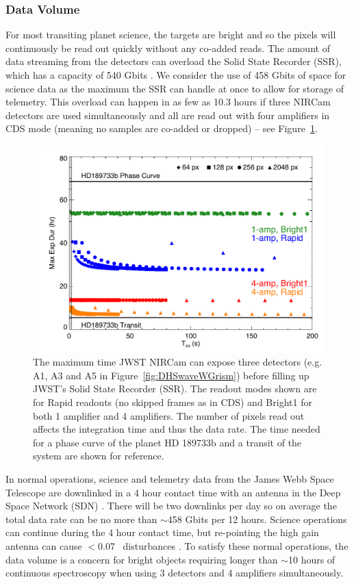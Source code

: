 \documentclass[iop]{emulateapj}
\begin{document}
\subsubsection{Data Volume}
For most transiting planet science, the targets are bright and so the pixels will continuously be read out quickly without any co-added reads.
The amount of data streaming from the detectors can overload the Solid State Recorder (SSR), which has a capacity of 540 Gbits \citep{johns2008L2comm}.
We consider the use of 458 Gbits of space for science data as the maximum the SSR can handle at once to allow for storage of telemetry.
This overload can happen in as few as 10.3 hours if three NIRCam detectors are used simultaneously and all are read out with four amplifiers in CDS mode (meaning no samples are co-added or dropped) -- see Figure~\ref{fig:DataVolume}.

\begin{figure}[!t]
\includegraphics[width=1.0\columnwidth]{NIRCam_grism_max_exp.pdf}
\caption{The maximum time JWST NIRCam can expose three detectors (e.g. A1, A3 and A5 in Figure~\ref{fig:DHSwaveWGrism}) before filling up JWST's Solid State Recorder (SSR). The readout modes shown are for Rapid readouts (no skipped frames as in CDS) and Bright1 for both 1 amplifier and 4 amplifiers. The number of pixels read out affects the integration time and thus the data rate. The time needed for a phase curve of the planet HD 189733b and a transit of the system are shown for reference.}\label{fig:DataVolume}
\end{figure}

In normal operations, science and telemetry data from the James Webb Space Telescope are downlinked in a 4 hour contact time with an antenna in the Deep Space Network (SDN)  \citep{dashevsky2008groundflight}.
There will be two downlinks per day so on average the total data rate can be no more than $\sim$458 Gbits per 12 hours.
Science operations can continue during the 4 hour contact time, but re-pointing the high gain antenna can cause $<$0.07 \arcsec\ disturbances \citep{beichman2014pasp}.
To satisfy these normal operations, the data volume is a concern for bright objects requiring longer than $\sim$10 hours of continuous spectroscopy when using 3 detectors and 4 amplifiers simultaneously.
\end{document}
